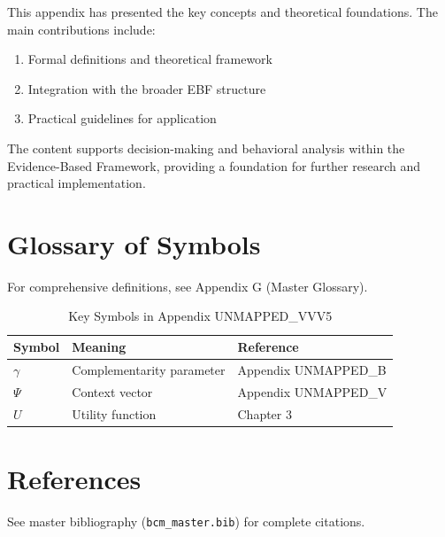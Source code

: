 This appendix has presented the key concepts and theoretical foundations.
The main contributions include:

\begin{enumerate}
    \item Formal definitions and theoretical framework
    \item Integration with the broader EBF structure
    \item Practical guidelines for application
\end{enumerate}

The content supports decision-making and behavioral analysis within the
Evidence-Based Framework, providing a foundation for further research
and practical implementation.


\section{Glossary of Symbols}
\label{sec:vvv5-glossary}

For comprehensive definitions, see Appendix G (Master Glossary).

\begin{table}[htbp]
\centering
\caption{Key Symbols in Appendix UNMAPPED_VVV5}
\begin{tabular}{lll}
\toprule
\textbf{Symbol} & \textbf{Meaning} & \textbf{Reference} \\
\midrule
$\gamma$ & Complementarity parameter & Appendix UNMAPPED_B \\
$\Psi$ & Context vector & Appendix UNMAPPED_V \\
$U$ & Utility function & Chapter 3 \\
\bottomrule
\end{tabular}
\end{table}


\section{References}
\label{sec:references}

See master bibliography (\texttt{bcm\_master.bib}) for complete citations.

\nocite{bcm_master}

